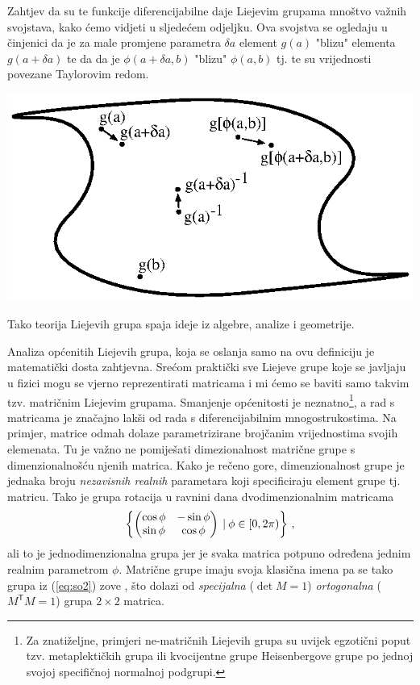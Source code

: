 Zahtjev da su te funkcije diferencijabilne daje Liejevim grupama mnoštvo važnih svojstava,
kako ćemo vidjeti u sljedećem odjeljku.
Ova svojstva se ogledaju
u činjenici da je za male promjene parametra $\delta a$
element $g(a)$ "blizu" elementa $g(a+\delta a)$ te da
da je $\phi(a+\delta a, b)$
"blizu" $\phi(a,b)$ tj. te su vrijednosti povezane Taylorovim redom.\\
\centerline{\includegraphics[scale=1.0]{pics/liejeva_mnogostrukost.eps}}
Tako teorija Liejevih grupa spaja ideje iz algebre, analize i geometrije.

Analiza općenitih Liejevih grupa, koja se oslanja samo na ovu definiciju
je matematički dosta zahtjevna. Srećom praktički sve Liejeve grupe koje se javljaju
u fizici mogu se vjerno reprezentirati matricama i mi ćemo se baviti
samo takvim tzv. matričnim Liejevim grupama. Smanjenje općenitosti je neznatno\footnote{Za
    znatiželjne, primjeri ne-matričnih Liejevih grupa su uvijek egzotični
    poput tzv. metaplektičkih grupa ili kvocijentne grupe Heisenbergove grupe po
jednoj svojoj specifičnoj normalnoj podgrupi.\label{fus:nematricne}},
a rad s matricama je značajno lakši od rada s diferencijabilnim mnogostrukostima.
Na primjer, matrice odmah dolaze parametrizirane brojčanim vrijednostima svojih
elemenata. Tu je važno
ne pomiješati dimezionalnost matrične grupe s dimenzionalnošću njenih matrica.
Kako je rečeno gore, dimenzionalnost grupe je jednaka broju \emph{nezavisnih realnih}
parametara koji specificiraju element grupe tj. matricu. Tako je grupa rotacija
u ravnini dana dvodimenzionalnim matricama
\begin{equation}
    \left\{ \begin{pmatrix}
        \cos\phi & -\sin\phi \\
        \sin\phi & \cos\phi 
    \end{pmatrix} 
     \: | \: \phi \in [0, 2\pi) \right\} \,,
    \label{eq:so2}
\end{equation}
ali to je jednodimenzionalna grupa jer je svaka matrica potpuno određena
jednim realnim parametrom $\phi$. Matrične grupe imaju svoja klasična
imena pa se tako grupa iz (\ref{eq:so2}) zove , što dolazi
od \emph{specijalna} ($\det M = 1$) \emph{ortogonalna} ($M^\mathsf{T} M = 1$) 
grupa $2\times 2$ matrica.


